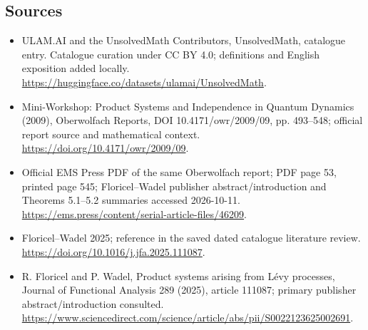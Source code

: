 \documentclass[11pt]{article}
\begin{document}
\subsection{Sources}
\begin{itemize}
\item[\hypertarget{source:statement:1}{S1}] ULAM.AI and the UnsolvedMath Contributors, UnsolvedMath, catalogue entry. Catalogue curation under CC BY 4.0; definitions and English exposition added locally.
\url{https://huggingface.co/datasets/ulamai/UnsolvedMath}.
\item[\hypertarget{source:statement:2}{S2}] Mini-Workshop: Product Systems and Independence in Quantum Dynamics (2009), Oberwolfach Reports, DOI 10.4171/owr/2009/09, pp. 493--548; official report source and mathematical context.
\url{https://doi.org/10.4171/owr/2009/09}.
\item[\hypertarget{source:statement:3}{S3}] Official EMS Press PDF of the same Oberwolfach report; PDF page 53, printed page 545; Floricel--Wadel publisher abstract/introduction and Theorems 5.1--5.2 summaries accessed 2026-10-11.
\url{https://ems.press/content/serial-article-files/46209}.
\item[\hypertarget{source:statement:4}{S4}] Floricel--Wadel 2025; reference in the saved dated catalogue literature review.
\url{https://doi.org/10.1016/j.jfa.2025.111087}.
\item[\hypertarget{source:statement:5}{S5}] R. Floricel and P. Wadel, Product systems arising from Lévy processes, Journal of Functional Analysis 289 (2025), article 111087; primary publisher abstract/introduction consulted.
\url{https://www.sciencedirect.com/science/article/abs/pii/S0022123625002691}.
\end{itemize}
\label{end:statement}
\end{document}
